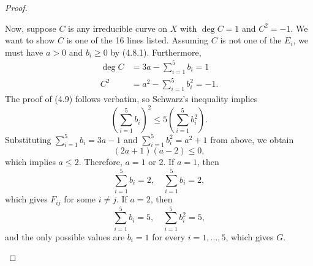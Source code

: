 \documentclass[a4paper]{article}
\begin{document}
\begin{enumerate} [label=\textbf{\arabic*.}, leftmargin=0em]
\begin{proof}
\begin{itemize} [leftmargin=0cm]
                              Now, suppose $C$ is any irreducible curve on $X$ with $\deg{C} = 1$ and $C^2 = -1$.
                              We want to show $C$ is one of the 16 lines listed.
                              Assuming $C$ is not one of the $E_i$, we must have $a > 0$ and $b_i \geq 0$ by (4.8.1).
                              Furthermore,
                              \begin{align*}
                                    \deg C & = 3a - \sum_{i = 1}^5 b_i = 1      \\
                                    C^2    & = a^2 - \sum_{i = 1}^5 b_i^2 = -1.
                              \end{align*}
                              The proof of (4.9) follows verbatim, so Schwarz's inequality implies
                              \begin{equation*}
                                    (\sum_{i =1 }^5 b_i)^2 \leq 5 (\sum_{i = 1}^5 b_i^2).
                              \end{equation*}
                              Substituting $\sum_{i = 1}^5 b_i = 3a - 1$ and $\sum_{i = 1}^5 b_i^2 = a^2 + 1$ from above, we obtain
                              \begin{equation*}
                                    (2a +1)(a - 2) \leq 0,
                              \end{equation*}
                              which implies $a \leq 2$.
                              Therefore, $a = 1$ or $2$.
                              If $a = 1$, then $$ \sum_{i = 1}^5 b_i = 2, \quad \sum_{i = 1}^5 b_i = 2,$$ which gives $F_{ij}$ for some $i \neq j$.
                              If $a = 2$, then
                              \begin{equation*}
                                    \sum_{i = 1}^5 b_i = 5, \quad \sum_{i = 1}^5 b_i^2 = 5,
                              \end{equation*}
                              and the only possible values are $b_i = 1$ for every $i = 1, \dots, 5$, which gives $G$.


\end{itemize}
\end{proof}
\end{enumerate}
\end{document}
